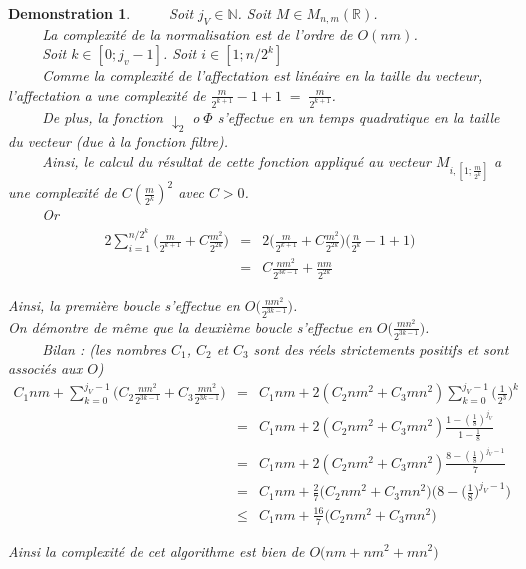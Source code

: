 \documentclass[a4paper,10pt]{report}
\theoremstyle{break}
\newtheorem{Dem}{Demonstration}
\begin{document}
    \begin{Dem}
	$\phantom{Prop}$ Soit $j_V \in \mathbb{N}$. Soit $M \in M_{n,m}(\mathbb{R})$. \\
	$\phantom{Prop}$ La complexit\'{e} de la normalisation est de l'ordre de $O (nm) $. \\
	$\phantom{Prop}$ Soit $k \in [0; j_v - 1]$. Soit $i \in [1;n/2^k]$ \\
	$\phantom{Prop}$ Comme la complexit\'{e} de l'affectation est lin\'{e}aire en la taille du vecteur,
	l'affectation a une complexit\'{e} de $ \frac{m}{2^{k + 1}} - 1 + 1 \; = \; \frac{m}{2^{k+1}}$.\\
	$\phantom{Prop}$ De plus, la fonction $ \downarrow_2 \; $o$ \; \varPhi $ s'effectue en un temps quadratique en la taille du vecteur 
	(due \`{a} la fonction filtre).\\
	$\phantom{Prop}$ Ainsi, le calcul du r\'{e}sultat de cette fonction appliqu\'{e} au vecteur $M_{i, [1;\frac{m}{2^k}]}$ a une 
	complexit\'{e} de $C (\frac{m}{2^k})^2$ avec $C > 0$. \\
	$\phantom{Prop}$ Or 
	\begin{eqnarray}
	  2 \displaystyle \sum_{i = 1}^{n/2^k} \Big( \frac{m}{2^{k+1}} + C\frac{m^2}{2^{2k}} \Big) & = &
	  2 \Big( \frac{m}{2^{k+1}} + C\frac{m^2}{2^{2k}} \Big) \Big( \frac{n}{2^k} - 1 + 1 \Big) \\
	  & = & C \frac{n m^2}{2^{3k - 1}} + \frac{nm}{2^{2k}} 
	\end{eqnarray}

	Ainsi, la premi\`{e}re boucle s'effectue en $ O \Big(\frac{n m^2}{2^{3k - 1}} \Big) $. \\
	On d\'{e}montre de m\^{e}me que la deuxi\`{e}me boucle s'effectue en $ O \Big(\frac{m n^2}{2^{3k - 1}} \Big) $. \\
	
	$\phantom{Prop}$ Bilan : (les nombres $C_1$, $C_2$ et $C_3$ sont des r\'{e}els strictements positifs et sont associ\'{e}s aux $O$)
	\begin{eqnarray}
	  C_1 nm + \displaystyle \sum_{k = 0}^{j_V - 1} \Big( C_2 \frac{n m^2}{2^{3k - 1}} + C_3 \frac{m n^2}{2^{3k - 1}} \Big) & = &
	  C_1 nm + 2 (C_2 n m^2 + C_3 m n^2) \displaystyle \sum_{k = 0}^{j_V - 1} \Big( \frac{1}{2^3} \Big)^k \\
	  & = & C_1 nm + 2 (C_2 n m^2 + C_3 m n^2) \frac{ 1 - (\frac{1}{8})^{j_V} }{ 1 - \frac{1}{8} } \\
	  & = & C_1 nm + 2 (C_2 n m^2 + C_3 m n^2) \frac{ 8 - (\frac{1}{8})^{j_V - 1} }{ 7 } \\
	  & = & C_1 nm + \frac{2}{7} \Big(C_2 n m^2 + C_3 m n^2 \Big) \Bigg( 8 - \bigg(\frac{1}{8} \bigg)^{j_V - 1} \Bigg) \\
	  & \leqslant & C_1 nm + \frac{16}{7} \Big(C_2 n m^2 + C_3 m n^2 \Big)
	\end{eqnarray}
	
	Ainsi la complexit\'{e} de cet algorithme est bien de $ \boxed{O \Big(nm + n m^2 + m n^2 \Big)} $
    
    \end{Dem}
    
\end{document}
